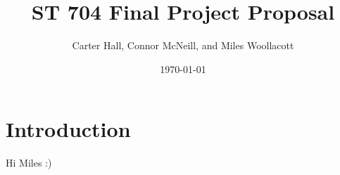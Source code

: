 \documentclass[11pt]{article}   	%
\title{{\bf{ST 704 Final Project Proposal}}}
\author{Carter Hall, Connor McNeill, and Miles Woollacott}
\date{\today}							%
\begin{document}
\maketitle

\section{Introduction}

Hi Miles :)
\end{document}
